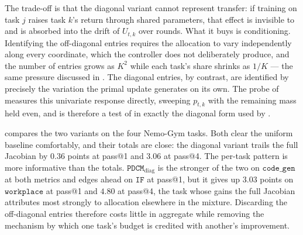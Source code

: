 The trade-off is that the diagonal variant cannot represent transfer: if training on task $j$
raises task $k$'s return through shared parameters, that effect is invisible to
 and is absorbed into the drift of $U_{t,k}$ over rounds. What it buys is
conditioning. Identifying the off-diagonal entries requires the allocation to vary
independently along every coordinate, which the controller does not deliberately produce, and
the number of entries grows as $K^2$ while each task's share shrinks as $1/K$ --- the same
pressure discussed in . The diagonal entries, by contrast, are identified by
precisely the variation the primal update generates on its own. The probe of
 measures this univariate response directly, sweeping $p_{t,k}$ with the
remaining mass held even, and is therefore a test of  in exactly the
diagonal form used by .

 compares the two variants on the four Nemo-Gym tasks. Both clear the
uniform baseline comfortably, and their totals are close: the diagonal variant trails the full
Jacobian by $0.36$ points at pass@1 and $3.06$ at pass@4. The per-task pattern is more
informative than the totals. $\texttt{PDCM}_{\mathrm{diag}}$ is the stronger of the two on
$\texttt{code\_gen}$ at both metrics and edges ahead on $\texttt{IF}$ at pass@1, but it gives up
$3.03$ points on $\texttt{workplace}$ at pass@1 and $4.80$ at pass@4, the task whose gains the
full Jacobian attributes most strongly to allocation elsewhere in the mixture. Discarding the
off-diagonal entries therefore costs little in aggregate while removing the mechanism by which
one task's budget is credited with another's improvement.

